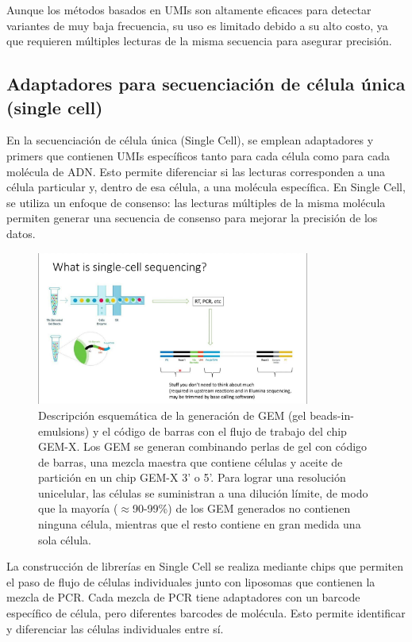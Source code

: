\begin{itemize}
Aunque los métodos basados en UMIs son altamente eficaces para detectar variantes de muy baja frecuencia, su uso es limitado debido a su alto costo, ya que requieren múltiples lecturas de la misma secuencia para asegurar precisión.

\subsection{Adaptadores para secuenciación de célula única (single cell)}
En la secuenciación de célula única (Single Cell), se emplean adaptadores y primers que contienen UMIs específicos tanto para cada célula como para cada molécula de ADN. Esto permite diferenciar si las lecturas corresponden a una célula particular y, dentro de esa célula, a una molécula específica. En Single Cell, se utiliza un enfoque de consenso: las lecturas múltiples de la misma molécula permiten generar una secuencia de consenso para mejorar la precisión de los datos.

\begin{figure}[htbp]
\centering
\includegraphics[width = 0.8\textwidth]{figs/single-cell-seq.jpg}
\caption{Descripción esquemática de la generación de GEM (gel beads-in-emulsions) y el código de barras con el flujo de trabajo del chip GEM-X. Los GEM se generan combinando perlas de gel con código de barras, una mezcla maestra que contiene células y aceite de partición en un chip GEM-X 3' o 5'. Para lograr una resolución unicelular, las células se suministran a una dilución límite, de modo que la mayoría ($\approx$90-99\%) de los GEM generados no contienen ninguna célula, mientras que el resto contiene en gran medida una sola célula.}
\end{figure}

La construcción de librerías en Single Cell se realiza mediante chips que permiten el paso de flujo de células individuales junto con liposomas que contienen la mezcla de PCR. Cada mezcla de PCR tiene adaptadores con un barcode específico de célula, pero diferentes barcodes de molécula. Esto permite identificar y diferenciar las células individuales entre sí.


\end{itemize}
